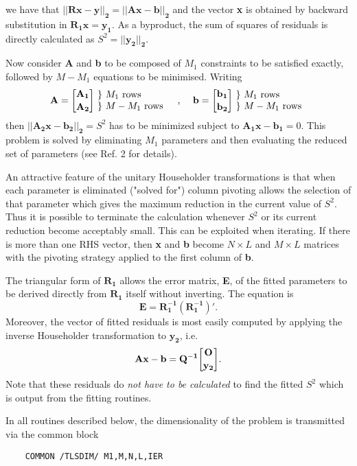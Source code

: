 we have that $\mathbf{||Rx - y||_2 = ||Ax - b||_2}$
and the vector {\bf x} is obtained by backward substitution in
$\mathbf{R_1x = y_1}$. As a byproduct, the sum of squares of
residuals is directly calculated as $S^2 = \mathbf{||y_2||_2}$.
\par
Now consider {\bf A} and {\bf b} to be composed of $M_1$ constraints
to be satisfied exactly, followed by $M-M_1$ equations to be minimised.
Writing
$$\mathbf{A = \binoms{A_1}{A_2}}
\begin{array}{@{ \ \} \ }l} M_1 \ \mbox{rows} \\ M-M_1 \ \mbox{rows}
\end{array}
\mbox{\quad , \quad}  \mathbf{b = \binoms{b_1}{b_2}}
\begin{array}{@{ \ \} \ }l} M_1 \ \mbox{rows} \\ M-M_1 \ \mbox{rows}
\end{array} $$
then $\mathbf{||A_2x-b_2||_2} = S^2$  has to be minimized
subject to $\mathbf{A_1x-b_1} = 0$.
\newpage
This problem is solved by eliminating $M_1$ parameters and then
evaluating the reduced set of parameters (see Ref. 2 for details).
\par
An attractive feature of the unitary Householder transformations
is that when each parameter is eliminated ("solved for")
column pivoting allows the selection of that parameter which gives the
maximum reduction in the current value of $S^2$.
Thus it is possible to terminate the calculation whenever $S^2$ or its
current reduction become acceptably small. This can be exploited when
iterating. If there is more than one RHS vector, then {\bf x} and {\bf b}
become $N \times L$ and $M \times L$ matrices with the pivoting strategy
applied to the first column of {\bf b}.
\par
The triangular form of $\mathbf{R_1}$ allows the error matrix, {\bf E},
of the fitted parameters to be derived directly from $\mathbf{R_1}$
itself without inverting. The equation is
$$\mathbf{E=R_1^{-1}(R_1^{-1})'}.$$
Moreover, the vector of fitted residuals is most easily computed by
applying the inverse Householder transformation to $\mathbf{y_2}$, i.e.
$$\mathbf{Ax-b=Q^{-1} \binoms{O}{y_2}}.$$
Note that these residuals do {\it not have to be calculated} to find
the fitted $S^2$ which is output from the fitting routines.
\par
In all routines described below, the dimensionality of the problem
is transmitted via the common block
\begin{verbatim}
    COMMON /TLSDIM/ M1,M,N,L,IER
\end{verbatim}
